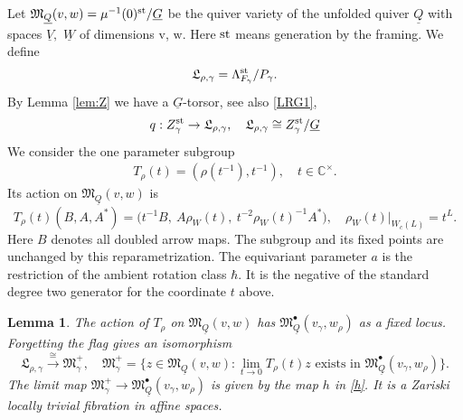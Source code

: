 \documentclass[11pt,reqno]{amsart}
\newtheorem{Lemma}[Theorem]{Lemma}
\theoremstyle{definition}
\theoremstyle{remark}
\def\bbC{\mathbb C}
\def\dG{\underline G}
\def\dV{\underline V}
\def\dW{\underline W}
\def\dQ{\underline Q}
\def\v{\mathrm v}
\def\w{\mathrm w}
\def\M{\mathfrak M}
\begin{document}
Let $\M_{\dQ}(v,w)=\mu^{-1}(0)^{\rm st}/\dG$ be the quiver variety
of the unfolded quiver $\dQ$ with spaces $\dV,$ $\dW$ of dimensions $\v$, $\w$.
Here ${\rm st}$ means generation by the framing. 
We define
\begin{align}\label{LRG2}\mathfrak L_{\rho,\gamma}=\Lambda_{F_\gamma}^{\rm st}/P_\gamma.\end{align}
By Lemma \ref{lem:Z} we have a $\dG$-torsor, see also \eqref{LRG1},
\begin{align}\label{QEG}
q:Z_\gamma^{\rm st}\to\mathfrak L_{\rho,\gamma}
,\quad
\mathfrak L_{\rho,\gamma}\cong Z_\gamma^{\rm st}/\dG
\end{align}
We consider the one parameter subgroup 
\begin{align}\label{TR}
T_\rho(t)=(\rho(t^{-1}),t^{-1}),\quad t\in\bbC^\times.
\end{align}
Its action on $\M_{\dQ}(v,w)$ is
\[
T_\rho(t)(B,A,A^*)=
\bigl(t^{-1}B,\ A\rho_W(t),\ t^{-2}\rho_W(t)^{-1}A^*\bigr),
\quad \rho_W(t)|_{W_c(L)}=t^L.
\]
Here $B$ denotes all doubled arrow maps. 
The subgroup and its fixed points are unchanged by this reparametrization. 
The equivariant parameter $a$  is the restriction
of the ambient rotation class $\hbar$.
It is the negative of the
standard degree two generator for the coordinate $t$ above. 



\begin{Lemma}\label{lem:attracting-stratum}
 The action of $T_\rho$ on $\M_{\dQ}(v,w)$
has $\M_{\dQ}^\bullet(v_\gamma,w_\rho)$ as a fixed locus. Forgetting the flag gives
an isomorphism
\[
 \mathfrak L_{\rho,\gamma}\xrightarrow{\cong}\mathfrak M_\gamma^+,
 \quad
 \mathfrak M_\gamma^+=\{z\in \M_{\dQ}(v,w):\lim_{t\to0}T_\rho(t)z
                     \text{ exists in }\M_{\dQ}^\bullet(v_\gamma,w_\rho)\}.
\]
The limit map $\mathfrak M_\gamma^+\to\M_{\dQ}^\bullet(v_\gamma,w_\rho)$ is given by the map $h$ in \eqref{h}.
It  is a Zariski locally trivial fibration in affine spaces. 
\end{Lemma}
\end{document}
